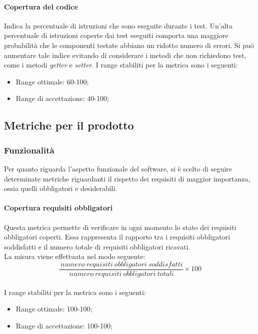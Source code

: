 			\paragraph{Copertura del codice}
			Indica la percentuale di istruzioni che sono eseguite durante i test. Un'alta percentuale di istruzioni coperte dai test eseguiti comporta una maggiore probabilità che le componenti testate abbiano un ridotto numero di errori. Si può aumentare tale indice evitando di considerare i metodi che non richiedono test, come i metodi \textit{getter} e \textit{setter}.
			I range stabiliti per la metrica sono i seguenti:
				\begin{itemize}
					\item Range ottimale: 60-100;
					\item Range di accettazione: 40-100;
				\end{itemize}
				
	\subsection{Metriche per il prodotto}
		\subsubsection{Funzionalità \label{S1}}
		Per quanto riguarda l'aspetto funzionale del software, si è scelto di seguire determinate metriche riguardanti il rispetto dei requisiti di maggior importanza, ossia quelli obbligatori e desiderabili.
			\paragraph{Copertura requisiti obbligatori}
			Questa metrica permette di verificare in ogni momento lo stato dei requisiti obbligatori coperti. Essa rappresenta il rapporto tra i requisiti obbligatori soddisfatti e il numero totale di requisiti obbligatori ricavati.
			\\La misura viene effettuata nel modo seguente:
			\begin{equation}
			\frac{~numero~requisiti~obbligatori~soddisfatti}{~numero~requisiti~obbligatori~totali}\times{100}
			\end{equation}
			\\I range stabiliti per la metrica sono i seguenti:
			\begin{itemize}
				\item Range ottimale: 100-100;
				\item Range di accettazione: 100-100;
			\end{itemize}
			
